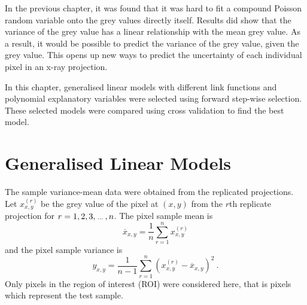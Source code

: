 In the previous chapter, it was found that it was hard to fit a compound Poisson random variable onto the grey values directly itself. Results did show that the variance of the grey value has a linear relationship with the mean grey value. As a result, it would be possible to predict the variance of the grey value, given the grey value. This opens up new ways to predict the uncertainty of each individual pixel in an x-ray projection.

In this chapter, generalised linear models \citep{nelder1972generalized, nelder1972generalized_2, mccullagh1984generalized} with different link functions and polynomial explanatory variables were selected using forward step-wise selection. These selected models were compared using cross validation to find the best model.

\section{Generalised Linear Models}

The sample variance-mean data were obtained from the replicated projections. Let $x_{x,y}^{(r)}$ be the grey value of the pixel at $(x,y)$ from the $r$th replicate projection for $r=1,2,3,\dotdotdot,n$. The pixel sample mean is
\begin{equation}
    \overline{x}_{x,y}=\frac{1}{n}\sum_{r=1}^n x_{x,y}^{(r)}
\end{equation}
and the pixel sample variance is
\begin{equation}
    y_{x,y} =
    \frac{1}{n-1}
    \sum_{r=1}^n
        \left(
            x_{x,y}^{(r)} - \overline{x}_{x,y}
        \right)^2
    \ .
\end{equation}
Only pixels in the region of interest (ROI) were considered here, that is pixels which represent the test sample.

